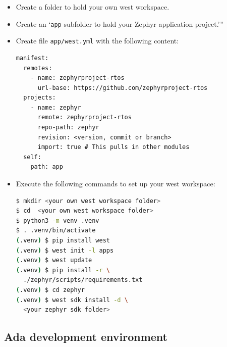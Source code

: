 \documentclass{AUJarticle}
\begin{document}
\begin{itemize}
\item Create a folder to hold your own west workspace.
\item Create an `\verb`app` subfolder to hold your Zephyr application project.'''
\item Create file \verb`app/west.yml` with the following content:

\begin{lstlisting}[basicstyle=\ttfamily\scriptsize]
manifest:
  remotes:
    - name: zephyrproject-rtos
      url-base: https://github.com/zephyrproject-rtos
  projects:
    - name: zephyr
      remote: zephyrproject-rtos
      repo-path: zephyr
      revision: <version, commit or branch>
      import: true # This pulls in other modules
  self:
    path: app
\end{lstlisting}

\item Execute the following commands to set up your west workspace:

\begin{lstlisting}[language=bash, basicstyle=\ttfamily\scriptsize]
$ mkdir <your own west workspace folder>
$ cd  <your own west workspace folder>
$ python3 -m venv .venv
$ . .venv/bin/activate
(.venv) $ pip install west
(.venv) $ west init -l apps
(.venv) $ west update
(.venv) $ pip install -r \
  ./zephyr/scripts/requirements.txt
(.venv) $ cd zephyr
(.venv) $ west sdk install -d \
  <your zephyr sdk folder>
\end{lstlisting}

\end{itemize}

\subsection{Ada development environment}
\end{document}

